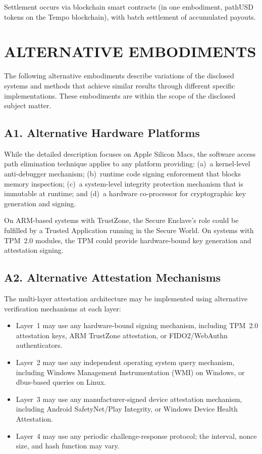 \documentclass[11pt,letterpaper]{article}
\begin{document}
Settlement occurs via blockchain smart contracts (in one embodiment, pathUSD tokens on the Tempo blockchain), with batch settlement of accumulated payouts.

\section{ALTERNATIVE EMBODIMENTS}

The following alternative embodiments describe variations of the disclosed systems and methods that achieve similar results through different specific implementations. These embodiments are within the scope of the disclosed subject matter.

\subsection{A1. Alternative Hardware Platforms}

While the detailed description focuses on Apple Silicon Macs, the software access path elimination technique applies to any platform providing: (a)~a kernel-level anti-debugger mechanism; (b)~runtime code signing enforcement that blocks memory inspection; (c)~a system-level integrity protection mechanism that is immutable at runtime; and (d)~a hardware co-processor for cryptographic key generation and signing.

On ARM-based systems with TrustZone, the Secure Enclave's role could be fulfilled by a Trusted Application running in the Secure World. On systems with TPM~2.0 modules, the TPM could provide hardware-bound key generation and attestation signing.

\subsection{A2. Alternative Attestation Mechanisms}

The multi-layer attestation architecture may be implemented using alternative verification mechanisms at each layer:

\begin{itemize}[nosep]
\item Layer~1 may use any hardware-bound signing mechanism, including TPM~2.0 attestation keys, ARM TrustZone attestation, or FIDO2/WebAuthn authenticators.
\item Layer~2 may use any independent operating system query mechanism, including Windows Management Instrumentation (WMI) on Windows, or dbus-based queries on Linux.
\item Layer~3 may use any manufacturer-signed device attestation mechanism, including Android SafetyNet/Play Integrity, or Windows Device Health Attestation.
\item Layer~4 may use any periodic challenge-response protocol; the interval, nonce size, and hash function may vary.
\end{itemize}
\end{document}
